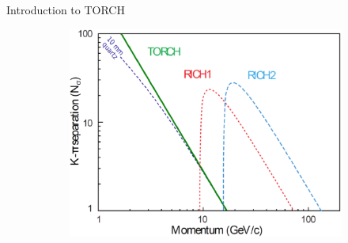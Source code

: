 \documentclass[xcolor={dvipsnames}]{beamer}
\begin{document}
\begin{frame}{Introduction to TORCH}
\begin{figure}
    \begin{subfigure}{0.43\textwidth}
      \centering
      \includegraphics[width = 1.0\textwidth]{Figs/TORCH_RICH_separation.png}
    \end{subfigure}
  \end{figure}
\end{frame}
\end{document}
